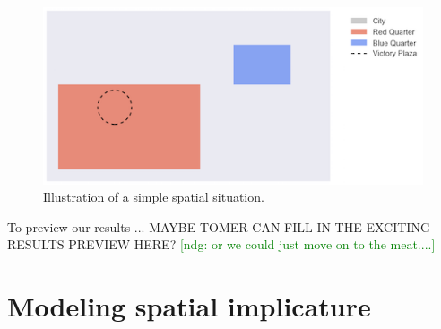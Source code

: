 \documentclass[10pt,letterpaper]{article}
\newcommand{\ndg}[1]{\textcolor{Green}{[ndg: #1]}}
\begin{document}

\begin{figure}[h]
\includegraphics[scale=.5]{figures/cityA1.png}
\caption{Illustration of a simple spatial situation.}
\label{illustration}
\end{figure}




To preview our results ... MAYBE TOMER CAN FILL IN THE EXCITING RESULTS PREVIEW HERE? \ndg{or we could just move on to the meat....}

\section{Modeling spatial implicature}\label{mod}
\end{document}
